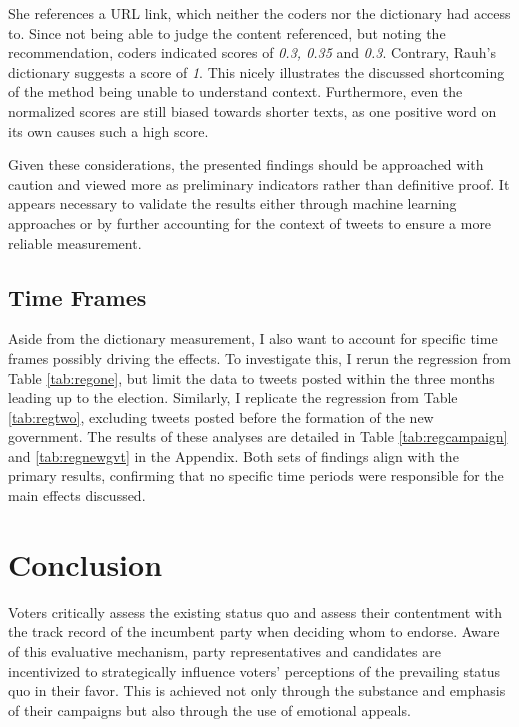 \documentclass[a4paper,11pt]{article}
\begin{document}
She references a URL link, which neither the coders nor the dictionary had access to. Since not being able to judge the content referenced, but noting the recommendation, coders indicated scores of \emph{0.3, 0.35} and \emph{0.3}. Contrary, Rauh's dictionary suggests a score of \emph{1}. This nicely illustrates the discussed shortcoming of the method being unable to understand context. Furthermore, even the normalized scores are still biased towards shorter texts, as one positive word on its own causes such a high score.

Given these considerations, the presented findings should be approached with caution and viewed more as preliminary indicators rather than definitive proof. It appears necessary to validate the results either through machine learning approaches or by further accounting for the context of tweets to ensure a more reliable measurement.

\hypertarget{time-frames}{%
\subsection{Time Frames}\label{time-frames}}

Aside from the dictionary measurement, I also want to account for specific time frames possibly driving the effects. To investigate this, I rerun the regression from Table \ref{tab:regone}, but limit the data to tweets posted within the three months leading up to the election. Similarly, I replicate the regression from Table \ref{tab:regtwo}, excluding tweets posted before the formation of the new government. The results of these analyses are detailed in Table \ref{tab:regcampaign} and \ref{tab:regnewgvt} in the Appendix. Both sets of findings align with the primary results, confirming that no specific time periods were responsible for the main effects discussed.

\hypertarget{conclusion}{%
\section{Conclusion}\label{conclusion}}

Voters critically assess the existing status quo and assess their contentment with the track record of the incumbent party when deciding whom to endorse. Aware of this evaluative mechanism, party representatives and candidates are incentivized to strategically influence voters' perceptions of the prevailing status quo in their favor. This is achieved not only through the substance and emphasis of their campaigns but also through the use of emotional appeals.
\end{document}
